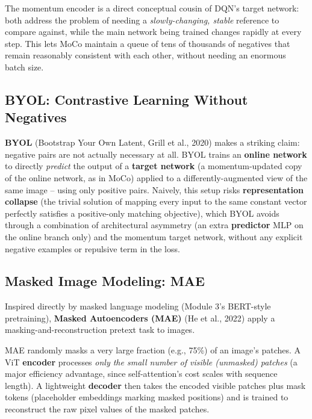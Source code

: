 \documentclass[12pt,a4paper]{article}
\begin{document}
\begin{keyidea}
The momentum encoder is a direct conceptual cousin of DQN's target network: both address the problem of needing a \emph{slowly-changing, stable} reference to compare against, while the main network being trained changes rapidly at every step. This lets MoCo maintain a queue of tens of thousands of negatives that remain reasonably consistent with each other, without needing an enormous batch size.
\end{keyidea}

\subsection{BYOL: Contrastive Learning Without Negatives}

\begin{keyidea}
\textbf{BYOL} (Bootstrap Your Own Latent, Grill et al., 2020) makes a striking claim: negative pairs are not actually necessary at all. BYOL trains an \textbf{online network} to directly \emph{predict} the output of a \textbf{target network} (a momentum-updated copy of the online network, as in MoCo) applied to a differently-augmented view of the same image -- using only positive pairs. Naively, this setup risks \textbf{representation collapse} (the trivial solution of mapping every input to the same constant vector perfectly satisfies a positive-only matching objective), which BYOL avoids through a combination of architectural asymmetry (an extra \textbf{predictor} MLP on the online branch only) and the momentum target network, without any explicit negative examples or repulsive term in the loss.
\end{keyidea}

\subsection{Masked Image Modeling: MAE}

Inspired directly by masked language modeling (Module 3's BERT-style pretraining), \textbf{Masked Autoencoders (MAE)} (He et al., 2022) apply a masking-and-reconstruction pretext task to images.

\begin{defbox}
MAE randomly masks a very large fraction (e.g., 75\%) of an image's patches. A ViT \textbf{encoder} processes \emph{only the small number of visible (unmasked) patches} (a major efficiency advantage, since self-attention's cost scales with sequence length). A lightweight \textbf{decoder} then takes the encoded visible patches plus mask tokens (placeholder embeddings marking masked positions) and is trained to reconstruct the raw pixel values of the masked patches.
\end{defbox}
\end{document}
